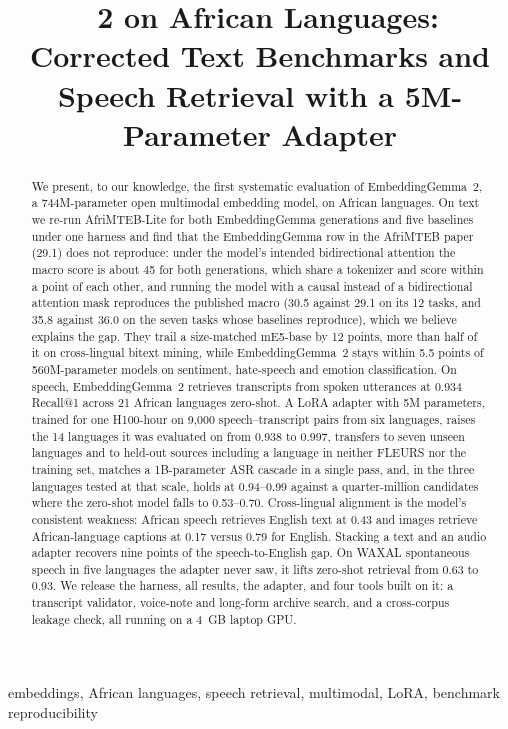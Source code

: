 \documentclass[conference]{IEEEtran}
\title{\eg{}~2 on African Languages: Corrected Text Benchmarks and
Speech Retrieval with a 5M-Parameter Adapter}
\author{\IEEEauthorblockN{Ugochukwu Onyebuchi}
\IEEEauthorblockA{Carnegie Mellon University / NaijaML\\
pyvinci@gmail.com}}
\newcommand{\eg}{EmbeddingGemma}
\newcommand{\egtwo}{EmbeddingGemma~2}
\begin{document}
\maketitle

\begin{abstract}
We present, to our knowledge, the first systematic evaluation of \egtwo{}, a 744M-parameter open
multimodal embedding model, on African languages. On text we re-run
AfriMTEB-Lite for both \eg{} generations and five baselines under one harness
and find that the \eg{} row in the AfriMTEB paper (29.1) does not reproduce:
under the model's intended bidirectional attention the macro score is about 45 for both generations, which share a tokenizer and score within a point of each other, and running the model with a causal instead of a
bidirectional attention mask reproduces the published macro (30.5 against 29.1 on its 12 tasks, and 35.8 against 36.0 on the seven tasks whose baselines reproduce), which we believe explains the gap. They trail a size-matched mE5-base by 12 points, more than half of it on cross-lingual bitext mining, while \egtwo{} stays within 5.5 points of 560M-parameter models on sentiment, hate-speech and emotion classification. On speech, \egtwo{} retrieves transcripts
from spoken utterances at 0.934 Recall@1 across 21 African languages zero-shot.
A LoRA adapter with 5M parameters, trained for one H100-hour on 9,000
speech--transcript pairs from six languages, raises the 14 languages it was evaluated on from 0.938 to 0.997, transfers to
seven unseen languages and to held-out sources including a language in neither
FLEURS nor the training set, matches a 1B-parameter ASR cascade in a single
pass, and, in the three languages tested at that scale, holds at 0.94--0.99 against a quarter-million candidates where the zero-shot model falls to 0.53--0.70. Cross-lingual alignment is the
model's consistent weakness: African speech retrieves English text at 0.43 and
images retrieve African-language captions at 0.17 versus 0.79 for English.
Stacking a text and an audio adapter recovers nine points of the speech-to-English gap. On
WAXAL spontaneous speech in five languages the adapter never saw, it lifts
zero-shot retrieval from 0.63 to 0.93. We release the harness, all results, the
adapter, and four tools built on it: a transcript validator, voice-note and
long-form archive search, and a cross-corpus leakage check, all running on a
4~GB laptop GPU.
\end{abstract}

\begin{IEEEkeywords}
embeddings, African languages, speech retrieval, multimodal, LoRA, benchmark reproducibility
\end{IEEEkeywords}
\end{document}
